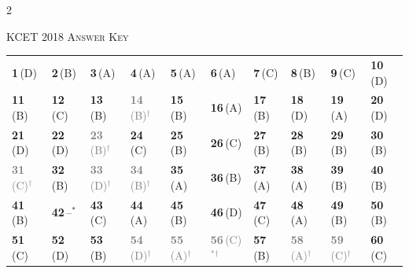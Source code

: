 \begin{multicols}{2}
{}

{}

\end{multicols}
\par{}\vspace{14pt}
\begin{center}{}\par
{\large\color{navy}\scshape KCET 2018 \textperiodcentered{} Answer Key}\end{center}
{\small\setlength{\tabcolsep}{1pt}\renewcommand{\arraystretch}{1.5}
\begin{tabularx}{\linewidth}{@{}*{10}{>{\centering\arraybackslash}X}@{}}\toprule
\textbf{1}\,(D) & \textbf{2}\,(B) & \textbf{3}\,(A) & \textbf{4}\,(A) & \textbf{5}\,(A) & \textbf{6}\,(A) & \textbf{7}\,(C) & \textbf{8}\,(B) & \textbf{9}\,(C) & \textbf{10}\,(D)\\
\textbf{11}\,(B) & \textbf{12}\,(C) & \textbf{13}\,(B) & \textcolor{gray}{\textbf{14}\,(B)$^{\dagger}$} & \textbf{15}\,(B) & \textbf{16}\,(A) & \textbf{17}\,(B) & \textbf{18}\,(D) & \textbf{19}\,(A) & \textbf{20}\,(D)\\
\textbf{21}\,(D) & \textbf{22}\,(D) & \textcolor{gray}{\textbf{23}\,(B)$^{\dagger}$} & \textbf{24}\,(C) & \textbf{25}\,(B) & \textbf{26}\,(C) & \textbf{27}\,(B) & \textbf{28}\,(B) & \textbf{29}\,(B) & \textbf{30}\,(B)\\
\textcolor{gray}{\textbf{31}\,(C)$^{\dagger}$} & \textbf{32}\,(B) & \textcolor{gray}{\textbf{33}\,(D)$^{\dagger}$} & \textcolor{gray}{\textbf{34}\,(B)$^{\dagger}$} & \textbf{35}\,(A) & \textbf{36}\,(B) & \textbf{37}\,(A) & \textbf{38}\,(A) & \textbf{39}\,(B) & \textbf{40}\,(B)\\
\textbf{41}\,(B) & \textbf{42}\,--$^{*}$ & \textbf{43}\,(C) & \textbf{44}\,(A) & \textbf{45}\,(B) & \textbf{46}\,(D) & \textbf{47}\,(C) & \textbf{48}\,(A) & \textbf{49}\,(B) & \textbf{50}\,(B)\\
\textbf{51}\,(C) & \textbf{52}\,(D) & \textbf{53}\,(B) & \textcolor{gray}{\textbf{54}\,(D)$^{\dagger}$} & \textcolor{gray}{\textbf{55}\,(A)$^{\dagger}$} & \textcolor{gray}{\textbf{56}\,(C)$^{*}$$^{\dagger}$} & \textbf{57}\,(B) & \textcolor{gray}{\textbf{58}\,(A)$^{\dagger}$} & \textcolor{gray}{\textbf{59}\,(C)$^{\dagger}$} & \textbf{60}\,(C)\\\bottomrule\end{tabularx}}\par\smallskip
